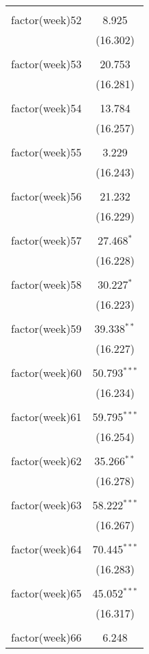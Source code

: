 \documentclass[twoside,twocolumn]{article}
\begin{document}
\begin{table}[!htbp]
\begin{tabular}{@{\extracolsep{5pt}}lc}
  & \\ 
 factor(week)52 & 8.925 \\ 
  & (16.302) \\ 
  & \\ 
 factor(week)53 & 20.753 \\ 
  & (16.281) \\ 
  & \\ 
 factor(week)54 & 13.784 \\ 
  & (16.257) \\ 
  & \\ 
 factor(week)55 & 3.229 \\ 
  & (16.243) \\ 
  & \\ 
 factor(week)56 & 21.232 \\ 
  & (16.229) \\ 
  & \\ 
 factor(week)57 & 27.468$^{*}$ \\ 
  & (16.228) \\ 
  & \\ 
 factor(week)58 & 30.227$^{*}$ \\ 
  & (16.223) \\ 
  & \\ 
 factor(week)59 & 39.338$^{**}$ \\ 
  & (16.227) \\ 
  & \\ 
 factor(week)60 & 50.793$^{***}$ \\ 
  & (16.234) \\ 
  & \\ 
 factor(week)61 & 59.795$^{***}$ \\ 
  & (16.254) \\ 
  & \\ 
 factor(week)62 & 35.266$^{**}$ \\ 
  & (16.278) \\ 
  & \\ 
 factor(week)63 & 58.222$^{***}$ \\ 
  & (16.267) \\ 
  & \\ 
 factor(week)64 & 70.445$^{***}$ \\ 
  & (16.283) \\ 
  & \\ 
 factor(week)65 & 45.052$^{***}$ \\ 
  & (16.317) \\ 
  & \\ 
 factor(week)66 & 6.248 \\ 

\end{tabular}
\end{table}
\end{document}
